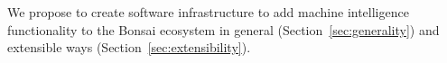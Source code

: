 We propose to create software infrastructure to add machine intelligence
functionality to the Bonsai ecosystem in general
(Section~\ref{sec:generality}) and extensible ways
(Section~\ref{sec:extensibility}).

